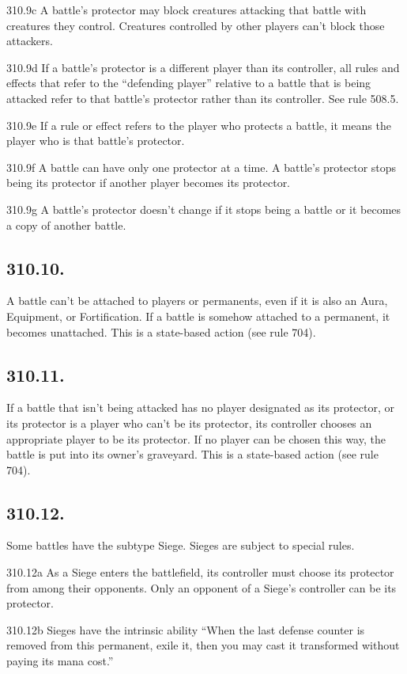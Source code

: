 310.9c A battle’s protector may block creatures attacking that battle with creatures they control. Creatures controlled by other players can’t block those attackers.

310.9d If a battle’s protector is a different player than its controller, all rules and effects that refer to the “defending player” relative to a battle that is being attacked refer to that battle’s protector rather than its controller. See rule 508.5.

310.9e If a rule or effect refers to the player who protects a battle, it means the player who is that battle’s protector.

310.9f A battle can have only one protector at a time. A battle’s protector stops being its protector if another player becomes its protector.

310.9g A battle’s protector doesn’t change if it stops being a battle or it becomes a copy of another battle.

\subsection*{310.10.}
A battle can’t be attached to players or permanents, even if it is also an Aura, Equipment, or Fortification. If a battle is somehow attached to a permanent, it becomes unattached. This is a state-based action (see rule 704).

\subsection*{310.11.}
If a battle that isn’t being attacked has no player designated as its protector, or its protector is a player who can’t be its protector, its controller chooses an appropriate player to be its protector. If no player can be chosen this way, the battle is put into its owner’s graveyard. This is a state-based action (see rule 704).

\subsection*{310.12.}
Some battles have the subtype Siege. Sieges are subject to special rules.

310.12a As a Siege enters the battlefield, its controller must choose its protector from among their opponents. Only an opponent of a Siege’s controller can be its protector.

310.12b Sieges have the intrinsic ability “When the last defense counter is removed from this permanent, exile it, then you may cast it transformed without paying its mana cost.”


